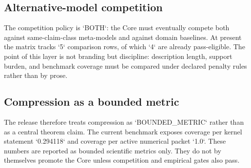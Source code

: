 \subsection{Alternative-model competition}
The competition policy is `BOTH`: the Core must eventually compete both against same-claim-class meta-models and against domain baselines.
At present the matrix tracks `5` comparison rows, of which `4` are already pass-eligible.
The point of this layer is not branding but discipline: description length, support burden, and benchmark coverage must be compared under declared penalty rules rather than by prose.

\subsection{Compression as a bounded metric}
The release therefore treats compression as `BOUNDED\_METRIC` rather than as a central theorem claim.
The current benchmark exposes coverage per kernel statement `0.294118` and coverage per active numerical packet `1.0`.
These numbers are reported as bounded scientific metrics only. They do not by themselves promote the Core unless competition and empirical gates also pass.
